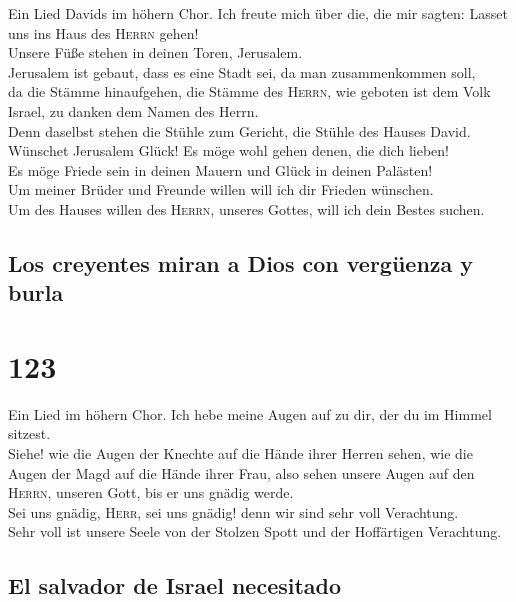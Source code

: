  Ein Lied Davids im höhern Chor. Ich freute mich über die,
die mir sagten: Lasset uns ins Haus des \textsc{Herrn} gehen!\\
 Unsere Füße stehen in deinen Toren, Jerusalem.\\
 Jerusalem ist gebaut, dass es eine Stadt sei, da man
zusammenkommen soll,\\
 da die Stämme hinaufgehen, die Stämme des \textsc{Herrn},
wie geboten ist dem Volk Israel, zu danken dem Namen des Herrn.\\
 Denn daselbst stehen die Stühle zum Gericht, die Stühle
des Hauses David.\\
 Wünschet Jerusalem Glück! Es möge wohl gehen denen, die
dich lieben!\\
 Es möge Friede sein in deinen Mauern und Glück in deinen
Palästen!\\
 Um meiner Brüder und Freunde willen will ich dir Frieden
wünschen.\\
 Um des Hauses willen des \textsc{Herrn}, unseres Gottes,
will ich dein Bestes suchen.

\hypertarget{los-creyentes-miran-a-dios-con-verguxfcenza-y-burla}{%
\subsection{Los creyentes miran a Dios con vergüenza y
burla}\label{los-creyentes-miran-a-dios-con-verguxfcenza-y-burla}}

\hypertarget{section-122}{%
\section{123}\label{section-122}}

 Ein Lied im höhern Chor. Ich hebe meine Augen auf zu dir,
der du im Himmel sitzest.\\
 Siehe! wie die Augen der Knechte auf die Hände ihrer
Herren sehen, wie die Augen der Magd auf die Hände ihrer Frau, also
sehen unsere Augen auf den \textsc{Herrn}, unseren Gott, bis er uns
gnädig werde.\\
 Sei uns gnädig, \textsc{Herr}, sei uns gnädig! denn wir
sind sehr voll Verachtung.\\
 Sehr voll ist unsere Seele von der Stolzen Spott und der
Hoffärtigen Verachtung.

\hypertarget{el-salvador-de-israel-necesitado}{%
\subsection{El salvador de Israel
necesitado}\label{el-salvador-de-israel-necesitado}}

